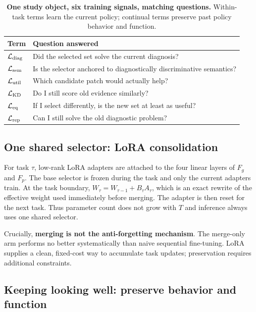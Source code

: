 \documentclass{article}
\def\L{{\cal L}}
\newcommand{\Fg}{F_g}
\newcommand{\Fp}{F_p}
\begin{document}
\begin{table}[t]
\centering
\footnotesize
\caption{\textbf{One study object, six training signals, matching questions.}
Within-task terms learn the current policy; continual terms preserve past policy behavior and function.}
\label{tab:questions}
\begin{tabular}{p{1.25cm}p{4.75cm}}
\toprule
Term & Question answered \\
\midrule
$\L_{\rm diag}$ & Did the selected set solve the current diagnosis? \\
$\L_{\rm sem}$ & Is the selector anchored to diagnostically discriminative semantics? \\
$\L_{\rm util}$ & Which candidate patch would actually help? \\
\midrule
$\L_{\rm KD}$ & Do I still score old evidence similarly? \\
$\L_{\rm eq}$ & If I select differently, is the new set at least as useful? \\
$\L_{\rm rep}$ & Can I still solve the old diagnostic problem? \\
\bottomrule
\end{tabular}
\end{table}

\subsection{One shared selector: LoRA consolidation}
\label{ssec:lora}

For task $\tau$, low-rank LoRA adapters are attached to the four linear layers of $\Fg$ and $\Fp$.
The base selector is frozen during the task and only the current adapters train.
At the task boundary, $W_{\tau}=W_{\tau-1}+B_\tau A_\tau$, which is an exact rewrite of the effective weight used immediately before merging.
The adapter is then reset for the next task.
Thus parameter count does not grow with $T$ and inference always uses one shared selector.

Crucially, \textbf{merging is not the anti-forgetting mechanism}.
The merge-only arm performs no better systematically than naive sequential fine-tuning.
LoRA supplies a clean, fixed-cost way to accumulate task updates; preservation requires additional constraints.

\subsection{Keeping looking well: preserve behavior and function}
\label{ssec:cl}
\end{document}
